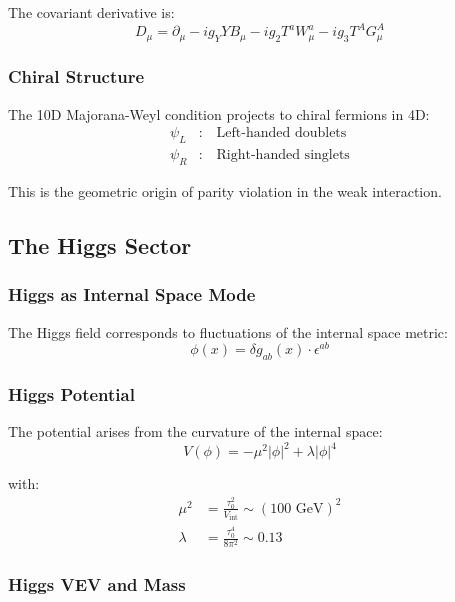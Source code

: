 The covariant derivative is:
\begin{equation}
    D_\mu = \partial_\mu - ig_Y Y B_\mu - ig_2 T^a W_\mu^a - ig_3 T^A G_\mu^A
\end{equation}

\subsubsection{Chiral Structure}

The 10D Majorana-Weyl condition projects to chiral fermions in 4D:
\begin{align}
    \psi_L &: \quad \text{Left-handed doublets} \\
    \psi_R &: \quad \text{Right-handed singlets}
\end{align}

This is the geometric origin of parity violation in the weak interaction.

\subsection{The Higgs Sector}

\subsubsection{Higgs as Internal Space Mode}

The Higgs field corresponds to fluctuations of the internal space metric:
\begin{equation}
    \phi(x) = \delta g_{ab}(x) \cdot \epsilon^{ab}
\end{equation}

\subsubsection{Higgs Potential}

The potential arises from the curvature of the internal space:
\begin{equation}
    V(\phi) = -\mu^2|\phi|^2 + \lambda|\phi|^4
\end{equation}

with:
\begin{align}
    \mu^2 &= \frac{\tau_0^2}{V_{\text{int}}} \sim (100 \text{ GeV})^2 \\
    \lambda &= \frac{\tau_0^4}{8\pi^2} \sim 0.13
\end{align}

\subsubsection{Higgs VEV and Mass}

